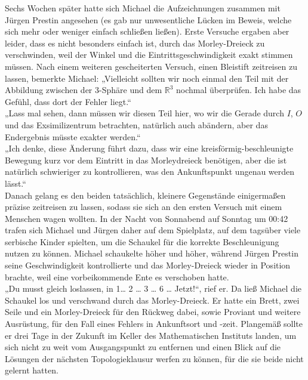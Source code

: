 \documentclass[oneside]{memoir}
\begin{document}
Sechs Wochen später hatte sich Michael die Aufzeichnungen zusammen mit Jürgen Prestin angesehen (es gab nur unwesentliche Lücken im Beweis, welche sich mehr oder weniger einfach schließen ließen). Erste Versuche ergaben aber leider, dass es nicht besonders einfach ist, durch das Morley-Dreieck zu verschwinden, weil der Winkel und die Eintrittsgeschwindigkeit exakt stimmen müssen. Nach einem weiteren gescheiterten Versuch, einen Bleistift zeitreisen zu lassen, bemerkte Michael: „Vielleicht sollten wir noch einmal den Teil mit der Abbildung zwischen der 3-Sphäre und dem $\mathbb{R}^3$ nochmal  überprüfen. Ich habe das Gefühl, dass dort der Fehler liegt.“ \\
„Lass mal sehen, dann müssen wir diesen Teil hier, wo wir die Gerade durch $I$, $O$ und das Exsimilizentrum betrachten, natürlich auch abändern, aber das Endergebnis müsste exakter werden.“ \\
„Ich denke, diese Änderung führt dazu, dass wir eine kreisförmig-beschleunigte Bewegung kurz vor dem Eintritt in das Morleydreieck benötigen, aber die ist natürlich schwieriger zu kontrollieren, was den Ankunftspunkt ungenau werden lässt.“ \\
Danach gelang es den beiden tatsächlich, kleinere Gegenstände einigermaßen präzise zeitreisen zu lassen, sodass sie sich an den ersten Versuch mit einem Menschen wagen wollten. In der Nacht von Sonnabend auf Sonntag um 00:42 trafen sich Michael und Jürgen daher auf dem Spielplatz, auf dem tagsüber viele serbische Kinder spielten, um die Schaukel für die korrekte Beschleunigung nutzen zu können. Michael schaukelte höher und höher, während Jürgen Prestin seine Geschwindigkeit kontrollierte und das Morley-Dreieck wieder in Position brachte, weil eine vorbeikommende Ente es verschoben hatte. \\
„Du musst gleich loslassen, in 1\ldots{} 2 \ldots{} 3 \ldots{} 6 \ldots{} Jetzt!“, rief er. Da ließ Michael die Schaukel los und verschwand durch das Morley-Dreieck. Er hatte ein Brett, zwei Seile und ein Morley-Dreieck für den Rückweg dabei, sowie Proviant und weitere Ausrüstung, für den Fall eines Fehlers in Ankunftsort und -zeit. Plangemäß sollte er drei Tage in der Zukunft im Keller des Mathematischen Instituts landen, um sich nicht zu weit vom Ausgangspunkt zu entfernen und einen Blick auf die Lösungen der nächsten Topologieklausur werfen zu können, für die sie beide nicht gelernt hatten. \\
\end{document}
